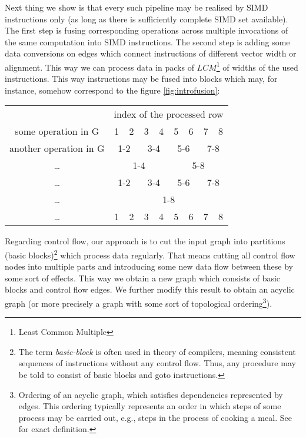   
Next thing we show is that every such pipeline may be realised by SIMD instructions only (as long as there is sufficiently complete SIMD set available). The first step is fusing corresponding operations across multiple invocations of the same computation into SIMD instructions. The second step is adding some data conversions on edges which connect instructions of different vector width or alignment. This way we can process data in packs of $LCM$\footnote{Least Common Multiple} of widths of the used instructions. This way instructions may be fused into blocks which may, for instance, somehow correspond to the figure \ref{fig:introfusion}:

\mybeginfig
\begin{center}
  \begin{tabular}{c|c|c|c|c|c|c|c|c|}
    \cline{2-9}
    & \multicolumn{8}{c|}{index of the processed row}\\
    \cline{2-9}
    some operation in G & 1 & 2 & 3 & 4 & 5 & 6 & 7 & 8 \\
    \cline{2-9}
    another operation in G & \multicolumn{2}{c|}{1-2} & \multicolumn{2}{c|}{3-4} & \multicolumn{2}{c|}{5-6} & \multicolumn{2}{c|}{7-8} \\
    \cline{2-9}
    \dots & \multicolumn{4}{c|}{1-4} & \multicolumn{4}{c|}{5-8}\\
    \cline{2-9}
    \dots & \multicolumn{2}{c|}{1-2} & \multicolumn{2}{c|}{3-4} & \multicolumn{2}{c|}{5-6} & \multicolumn{2}{c|}{7-8}\\
    \cline{2-9}
    \dots & \multicolumn{8}{c|}{1-8} \\
    \cline{2-9}
    \dots & 1 & 2 & 3 & 4 & 5 & 6 & 7 & 8\\
    \cline{2-9}
  \end{tabular}
\end{center}


  Regarding control flow, our approach is to cut the input graph into partitions (basic blocks)\footnote{The term \emph{basic-block} is often used in theory of compilers, meaning consistent sequences of instructions without any control flow. Thus, any procedure may be told to consist of basic blocks and goto instructions.} which process data regularly. That means cutting all control flow nodes into multiple parts and introducing some new data flow between these by some sort of effects. This way we obtain a new graph which consists of basic blocks and control flow edges. We further modify this result to obtain an acyclic graph (or more precisely a graph with some sort of topological ordering\footnote{Ordering of an acyclic graph, which satisfies dependencies represented by edges. This ordering typically represents an order in which steps of some process may be carried out, e.g., steps in the process of cooking a meal. See \cite{chapters} for exact definition.}). 

